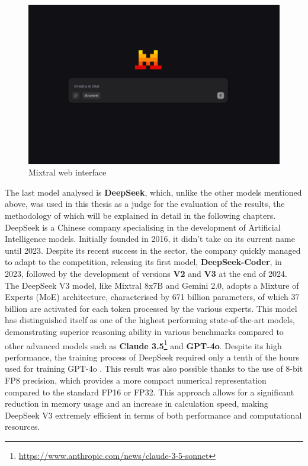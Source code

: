 \begin{figure}[h]
    \centering
    \includegraphics[width=0.7\linewidth]{Figures/Mixtral.png}
    \caption{Mixtral web interface}
    \label{fig:graph}
\end{figure}
The last model analysed is \textbf{DeepSeek}, which, unlike the other models mentioned above, was used in this thesis as a judge for the evaluation of the results, the methodology of which will be explained in detail in the following chapters.
DeepSeek is a Chinese company specialising in the development of Artificial Intelligence models. Initially founded in 2016, it didn't take on its current name until 2023. Despite its recent success in the sector, the company quickly managed to adapt to the competition, releasing its first model, \textbf{DeepSeek-Coder}, in 2023, followed by the development of versions \textbf{V2} and \textbf{V3} at the end of 2024.
The DeepSeek V3 model, like Mixtral 8x7B and Gemini 2.0, adopts a Mixture of Experts (MoE) architecture, characterised by 671 billion parameters, of which 37 billion are activated for each token processed by the various experts. This model has distinguished itself as one of the highest performing state-of-the-art models, demonstrating superior reasoning ability in various benchmarks compared to other advanced models such as \textbf{Claude 3.5}\footnote{\url{https://www.anthropic.com/news/claude-3-5-sonnet}} and \textbf{GPT-4o}.
Despite its high performance, the training process of DeepSeek required only a tenth of the hours used for training GPT-4o \cite{Deepseek}.
This result was also possible thanks to the use of 8-bit FP8 precision, which provides a more compact numerical representation compared to the standard FP16 or FP32. This approach allows for a significant reduction in memory usage and an increase in calculation speed, making DeepSeek V3 extremely efficient in terms of both performance and computational resources.

